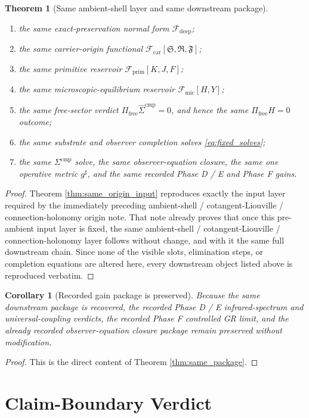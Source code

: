 \documentclass[11pt]{article}
\newcommand{\CompletedMetric}{g^{\sharp}}
\newcommand{\CompLift}{\widehat\Sigma^{\mathrm{cmp}}}
\newcommand{\FreeProj}{\Pi_{\mathrm{free}}}
\newcommand{\GaugeAux}{Y}
\newcommand{\MicFunctional}{\mathscr F_{\mathrm{mic}}}
\newcommand{\PrimFunctional}{\mathscr F_{\mathrm{prim}}}
\newcommand{\CarrierFunctional}{\mathscr F_{\mathrm{car}}}
\newcommand{\DeepFunctional}{\mathscr F_{\mathrm{deep}}}
\newcommand{\PrimStrain}{K}
\newcommand{\PrimNeutral}{J}
\newcommand{\PrimFree}{F}
\newcommand{\CarrierSeed}{\mathfrak S}
\newcommand{\RelabelSeed}{\mathfrak R}
\newcommand{\FreeSeed}{\mathfrak F}
\newtheorem{corollary}{Corollary}
\newtheorem{theorem}{Theorem}
\begin{document}
\begin{theorem}[Same ambient-shell layer and same downstream package]
\begin{enumerate}
    \item the same exact-preservation normal form \(\DeepFunctional\);
    \item the same carrier-origin functional \(\CarrierFunctional[\CarrierSeed,\RelabelSeed,\FreeSeed]\);
    \item the same primitive reservoir \(\PrimFunctional[\PrimStrain,\PrimNeutral,\PrimFree]\);
    \item the same microscopic-equilibrium reservoir \(\MicFunctional[H,\GaugeAux]\);
    \item the same free-sector verdict \(\FreeProj\CompLift=0\), and hence the same \(\Pi_{\mathrm{free}}H=0\) outcome;
    \item the same substrate and observer completion solves \eqref{eq:fixed_solves};
    \item the same \(\Sigma^{\mathrm{cmp}}\) solve, the same observer-equation closure, the same one operative metric \(\CompletedMetric\), and the same recorded Phase D / E and Phase F gains.
\end{enumerate}
\end{theorem}

\begin{proof}
Theorem \ref{thm:same_origin_input} reproduces exactly the input layer required by the immediately preceding ambient-shell / cotangent-Liouville / connection-holonomy origin note. That note already proves that once this pre-ambient input layer is fixed, the same ambient-shell / cotangent-Liouville / connection-holonomy layer follows without change, and with it the same full downstream chain. Since none of the visible slots, elimination steps, or completion equations are altered here, every downstream object listed above is reproduced verbatim.
\end{proof}

\begin{corollary}[Recorded gain package is preserved]
\label{cor:gains}
Because the same downstream package is recovered, the recorded Phase D / E infrared-spectrum and universal-coupling verdicts, the recorded Phase F controlled GR limit, and the already recorded observer-equation closure package remain preserved without modification.
\end{corollary}

\begin{proof}
This is the direct content of Theorem \ref{thm:same_package}.
\end{proof}

\section{Claim-Boundary Verdict}
\end{document}
